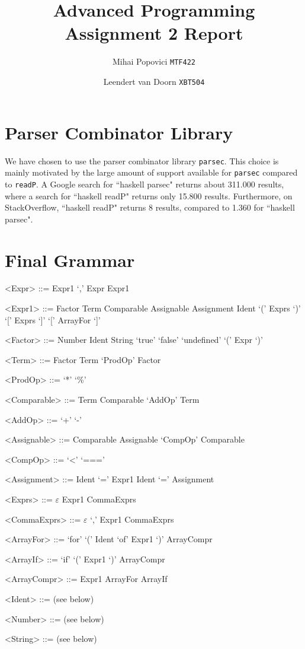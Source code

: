 \documentclass{article}
\title{Advanced Programming Assignment 2 Report}
\author{Mihai Popovici \texttt{MTF422} \and Leendert van Doorn \texttt{XBT504}}
\begin{document}
\maketitle




\section{Parser Combinator Library}
We have chosen to use the parser combinator library \texttt{parsec}. This choice is mainly motivated by the large amount of support available for \texttt{parsec} compared to \texttt{readP}. A Google search for ``haskell parsec" returns about 311.000 results, where a search for ``haskell readP" returns only 15.800 results. Furthermore, on StackOverflow, ``haskell readP" returns 8 results, compared to 1.360 for ``haskell parsec".

\section{Final Grammar}

\setlength{\grammarparsep}{4pt plus 1pt minus 1pt} %
\setlength{\grammarindent}{9em} %

\begin{grammar}
	\let\syntleft\relax
	\let\syntright\relax
	
	<Expr> ::= Expr1 `,' Expr
	\alt Expr1

	<Expr1> ::= Factor
	\alt Term
	\alt Comparable
	\alt Assignable
	\alt Assignment
	\alt Ident `(' Exprs `)'
	\alt `[' Exprs `]'
	\alt `[' ArrayFor `]'
		
	<Factor> ::= Number
	\alt Ident
	\alt String
	\alt `true'
	\alt `false'
	\alt `undefined'
	\alt `(' Expr `)'
	
	<Term> ::= Factor
	\alt Term `ProdOp' Factor
	
	<ProdOp> ::= `*'
	\alt `\%'
	
	<Comparable> ::= Term
	\alt Comparable `AddOp' Term
	
	<AddOp> ::= `+'
	\alt `-'
	
	<Assignable> ::= Comparable
	\alt Assignable `CompOp' Comparable	
	
	<CompOp> ::= `<'
	\alt `==='
	
	<Assignment> ::= Ident `=' Expr1
	\alt Ident `=' Assignment %
	
	<Exprs> ::= $\varepsilon$
	\alt Expr1 CommaExprs	
	
	<CommaExprs> ::= $\varepsilon$
	\alt `,' Expr1 CommaExprs
	
	<ArrayFor> ::= `for' `(' Ident `of' Expr1 `)' ArrayCompr
	
	<ArrayIf> ::= `if' `(' Expr1 `)' ArrayCompr
	
	<ArrayCompr> ::= Expr1
	\alt ArrayFor
	\alt ArrayIf
	
	<Ident> ::= (see below)
	
	<Number> ::= (see below)
	
	<String> ::= (see below)
\end{grammar}
\end{document}
